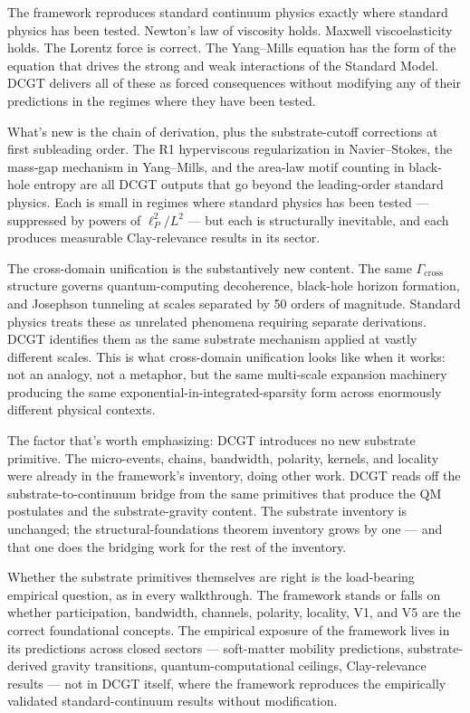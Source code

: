 \documentclass[11pt,a4paper]{article}
\begin{document}
The framework reproduces standard continuum physics exactly where standard physics has been tested. Newton's law of viscosity holds. Maxwell viscoelasticity holds. The Lorentz force is correct. The Yang--Mills equation has the form of the equation that drives the strong and weak interactions of the Standard Model. DCGT delivers all of these as forced consequences without modifying any of their predictions in the regimes where they have been tested.

What's new is the chain of derivation, plus the substrate-cutoff corrections at first subleading order. The R1 hyperviscous regularization in Navier--Stokes, the mass-gap mechanism in Yang--Mills, and the area-law motif counting in black-hole entropy are all DCGT outputs that go beyond the leading-order standard physics. Each is small in regimes where standard physics has been tested --- suppressed by powers of $\ell_P^2/L^2$ --- but each is structurally inevitable, and each produces measurable Clay-relevance results in its sector.

The cross-domain unification is the substantively new content. The same $\Gamma_{\mathrm{cross}}$ structure governs quantum-computing decoherence, black-hole horizon formation, and Josephson tunneling at scales separated by 50 orders of magnitude. Standard physics treats these as unrelated phenomena requiring separate derivations. DCGT identifies them as the same substrate mechanism applied at vastly different scales. This is what cross-domain unification looks like when it works: not an analogy, not a metaphor, but the same multi-scale expansion machinery producing the same exponential-in-integrated-sparsity form across enormously different physical contexts.

The factor that's worth emphasizing: DCGT introduces no new substrate primitive. The micro-events, chains, bandwidth, polarity, kernels, and locality were already in the framework's inventory, doing other work. DCGT reads off the substrate-to-continuum bridge from the same primitives that produce the QM postulates and the substrate-gravity content. The substrate inventory is unchanged; the structural-foundations theorem inventory grows by one --- and that one does the bridging work for the rest of the inventory.

Whether the substrate primitives themselves are right is the load-bearing empirical question, as in every walkthrough. The framework stands or falls on whether participation, bandwidth, channels, polarity, locality, V1, and V5 are the correct foundational concepts. The empirical exposure of the framework lives in its predictions across closed sectors --- soft-matter mobility predictions, substrate-derived gravity transitions, quantum-computational ceilings, Clay-relevance results --- not in DCGT itself, where the framework reproduces the empirically validated standard-continuum results without modification.
\end{document}
